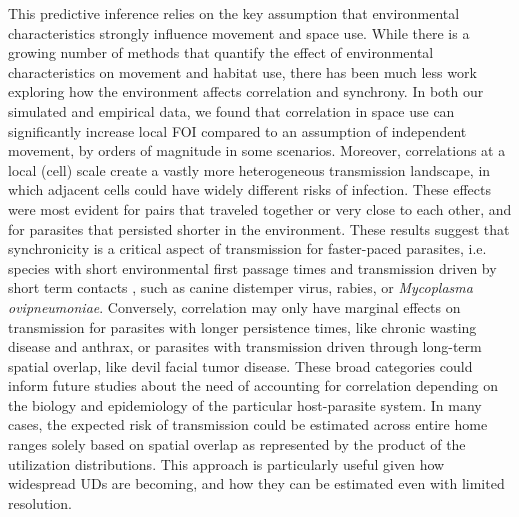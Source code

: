 \documentclass[letterpaper]{article}
\begin{document}
This predictive inference relies on the key assumption that environmental characteristics strongly influence movement and space use. While there is a growing number of methods that quantify the effect of environmental characteristics on movement and habitat use, there has been much less work exploring how the environment affects correlation and synchrony. 
In both our simulated and empirical data, we found that correlation in space use can significantly increase local FOI compared to an assumption of independent movement, by orders of magnitude in some scenarios. Moreover, correlations at a local (cell) scale create a vastly more heterogeneous transmission landscape, in which adjacent cells could have widely different risks of infection. These effects were most evident for pairs that traveled together or very close to each other, and for parasites that persisted shorter in the environment. 
These results suggest that synchronicity is a critical aspect of transmission for faster-paced parasites, i.e. species with short environmental first passage times and transmission driven by short term contacts \citep[cf.][]{Manlove2022}, such as canine distemper virus, rabies, or \emph{Mycoplasma ovipneumoniae}. Conversely, correlation may only have marginal effects on transmission for parasites with longer persistence times, like chronic wasting disease and anthrax, or parasites with transmission driven through long-term spatial overlap, like devil facial tumor disease. These broad categories could inform future studies about the need of accounting for correlation depending on the biology and epidemiology of the particular host-parasite system. In many cases, the expected risk of transmission could be estimated across entire home ranges solely based on spatial overlap as represented by the product of the utilization distributions. This approach is particularly useful given how widespread UDs are becoming, and how they can be estimated even with limited resolution.

\end{document}
